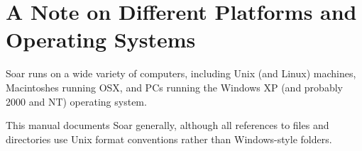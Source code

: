 \section{A Note on Different Platforms and Operating Systems}
\label{INTRO-platforms}

Soar runs on a wide variety of computers, including Unix (and Linux) machines,
Macintoshes running OSX, and PCs running the Windows XP (and probably 2000 and NT) operating system.

This manual documents Soar generally, although all references to files
and directories use Unix format conventions rather than Windows-style folders.


